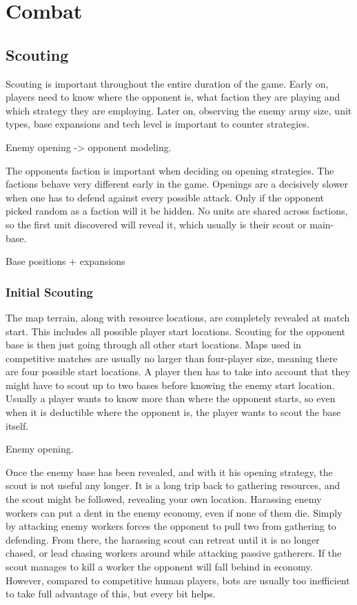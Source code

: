\chapter{Combat}

\section{Scouting}
Scouting is important throughout the entire duration of the game. Early on, players need to know where the opponent is, what faction they are playing and which strategy they are employing. Later on, observing the enemy army size, unit types, base expansions and tech level is important to counter strategies.

Enemy opening -> opponent modeling.

The opponents faction is important when deciding on opening strategies. The factions behave very different early in the game. Openings are a decisively slower when one has to defend against every possible attack. Only if the opponent picked random as a faction will it be hidden. No units are shared across factions, so the first unit discovered will reveal it, which usually is their scout or main-base.

Base positions + expansions


	\subsection{Initial Scouting}

	The map terrain, along with resource locations, are completely revealed at match start. This includes all possible player start locations. Scouting for the opponent base is then just going through all other start locations. Maps used in competitive matches are usually no larger than four-player size, meaning there are four possible start locations. A player then has to take into account that they might have to scout up to two bases before knowing the enemy start location. Usually a player wants to know more than where the opponent starts, so even when it is deductible where the opponent is, the player wants to scout the base itself.
	
	Enemy opening.
	
	Once the enemy base has been revealed, and with it his opening strategy, the scout is not useful any longer. It is a long trip back to gathering resources, and the scout might be followed, revealing your own location. Harassing enemy workers can put a dent in the enemy economy, even if none of them die. Simply by attacking enemy workers forces the opponent to pull two from gathering to defending. From there, the harassing scout can retreat until it is no longer chased, or lead chasing workers around while attacking passive gatherers. If the scout manages to kill a worker the opponent will fall behind in economy. However, compared to competitive human players, bots are usually too inefficient to take full advantage of this, but every bit helps.
	
